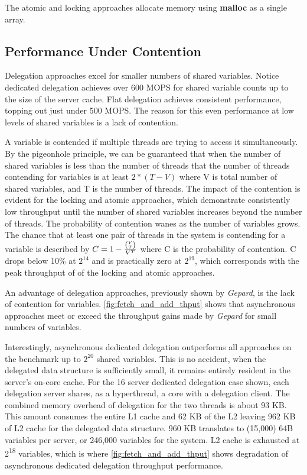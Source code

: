 \documentclass{uicthesi}
\begin{document}
The atomic and locking approaches allocate memory using \textbf{malloc} as a single array. 

\subsection{Performance Under Contention}

Delegation approaches excel for smaller numbers of shared variables. Notice dedicated delegation achieves over 600 MOPS for shared variable counts up to the size of the server cache. Flat delegation achieves consistent performance, topping out just under 500 MOPS. The reason for this even performance at low levels of shared variables is a lack of contention.

A variable is contended if multiple threads are trying to access it simultaneously. By the pigeonhole principle, we can be guaranteed that when the number of shared variables is less than the number of threads that the number of threads contending for variables is at least $ 2 * (T - V) $ where  V is total number of shared variables, and T is the number of threads. The impact of the contention is evident for the locking and atomic approaches, which demonstrate consistently low throughput until the number of shared variables increases beyond the number of threads. The probability of contention wanes as the number of variables grows. The chance that at least one pair of threads in the system is contending for a variable is described by $C = 1 - {{ V \choose T }  \over  V^{T}}$ where C is the probability of contention. C drops below 10\% at $2^{14}$ and is practically zero at $2^{19}$, which corresponds with the peak throughput of of the locking and atomic approaches. 
 
An advantage of delegation approaches, previously shown by \textit{Gepard}, is the lack of contention for variables. \ref{fig:fetch_and_add_thput} shows that asynchronous approaches meet or exceed the throughput gains made by \textit{Gepard} for small numbers of variables. 

Interestingly, asynchronous dedicated delegation outperforms all approaches on the benchmark up to $2^{20}$ shared variables. This is no accident, when the delegated data structure is sufficiently small, it remains entirely resident in the server's on-core cache. For the 16 server dedicated delegation case shown, each delegation server shares, as a hyperthread, a core with a delegation client. The combined memory overhead of delegation for the two threads is about 93 KB. This amount consumes the entire L1 cache and 62 KB of the L2 leaving 962 KB of L2 cache for the delegated data structure. 960 KB translates to (15,000) 64B variables per server, or 246,000 variables for the system. L2 cache is exhausted at 2\textsuperscript{18} variables, which is where \ref{fig:fetch_and_add_thput} shows degradation of asynchronous dedicated delegation throughput performance. 
\end{document}
